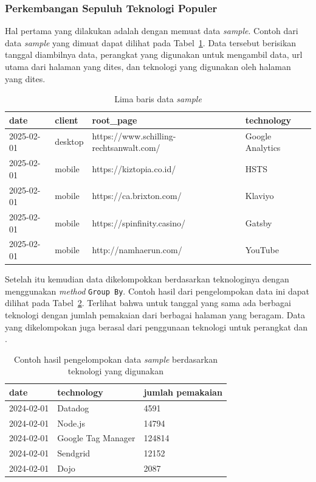 \subsubsection{Perkembangan Sepuluh Teknologi Populer}
Hal pertama yang dilakukan adalah dengan memuat data \textit{sample}. Contoh dari data \textit{ sample} yang dimuat dapat dilihat pada Tabel~\ref{tab:sample}. Data tersebut berisikan tanggal diambilnya data, perangkat yang digunakan untuk mengambil data, url utama dari halaman \web yang dites, dan teknologi yang digunakan oleh halaman \web yang dites.
\begin{table}[H]
    \centering
    \caption{Lima baris data \textit{sample}}
    \label{tab:sample}
    \begin{tabular}{|l|l|l|l|}
        \hline
        date & client & root\_page & technology \\ \hline
        2025-02-01 & desktop & https://www.schilling-rechtsanwalt.com/ & Google Analytics \\ \hline
        2025-02-01 & mobile & https://kiztopia.co.id/ & HSTS \\ \hline
        2025-02-01 & mobile & https://ca.brixton.com/ & Klaviyo \\ \hline
        2025-02-01 & mobile & https://spinfinity.casino/ & Gatsby \\ \hline
        2025-02-01 & mobile & http://namhaerun.com/ & YouTube \\ \hline
    \end{tabular}
\end{table}

Setelah itu kemudian data dikelompokkan berdasarkan teknologinya dengan menggunakan \textit{method} \verb|Group By|. Contoh hasil dari pengelompokan data ini dapat dilihat pada Tabel~\ref{tab:gbsample}. Terlihat bahwa untuk tanggal yang sama ada berbagai teknologi dengan jumlah pemakaian dari berbagai halaman \web yang beragam. Data yang dikelompokan juga berasal dari penggunaan teknologi untuk perangkat \mobile dan \desktop.
\begin{table}[H]
    \centering
    \caption{Contoh hasil pengelompokan data \textit{sample} berdasarkan teknologi yang digunakan}
    \label{tab:gbsample}
    \begin{tabular}{|l|l|l|}
        \hline
        date & technology & jumlah pemakaian \\ \hline
        2024-02-01 & Datadog & 4591 \\ \hline
        2024-02-01 & Node.js & 14794 \\ \hline
        2024-02-01 & Google Tag Manager & 124814 \\ \hline
        2024-02-01 & Sendgrid & 12152 \\ \hline
        2024-02-01 & Dojo & 2087 \\ \hline
    \end{tabular}
\end{table}

